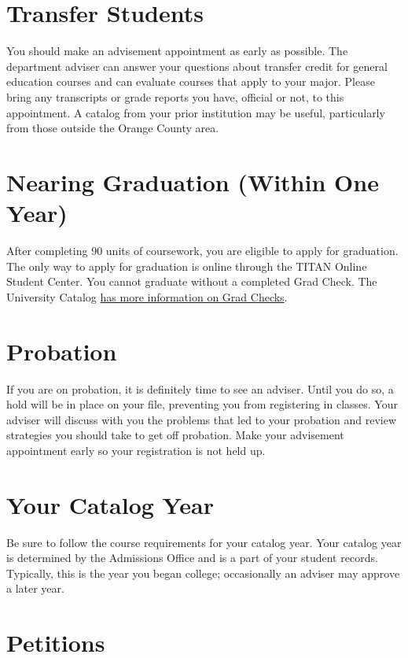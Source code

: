 \documentclass{book}
\begin{document}
\section{Transfer Students}
You should make an advisement appointment as early as possible. The department adviser can answer your questions about transfer credit for general education courses and can evaluate courses that apply to your major. Please bring any transcripts or grade reports you have, official or not, to this appointment. A catalog from your prior institution may be useful, particularly from those outside the Orange County area.

\section{Nearing Graduation (Within One Year)}
After completing 90 units of coursework, you are eligible to apply for graduation. The only way to apply for graduation is online through the TITAN Online Student Center. You cannot graduate without a completed Grad Check.  The University Catalog \href{http://catalog.fullerton.edu/content.php?catoid=2&navoid=108#Graduation_Requirement_Check}{has more information on Grad Checks}.

\section{Probation}
If you are on probation, it is definitely time to see an adviser. Until you do so, a hold will be in place on your file, preventing you from registering in classes. Your adviser will discuss with you the problems that led to your probation and review strategies you should take to get off probation. Make your advisement appointment early so your registration is not held up.

\section{Your Catalog Year}
Be sure to follow the course requirements for your catalog year. Your catalog year is determined by the Admissions Office and is a part of your student records. Typically, this is the year you began college; occasionally an adviser may approve a later year.

\section{Petitions}
\label{section:petitions}
\end{document}
